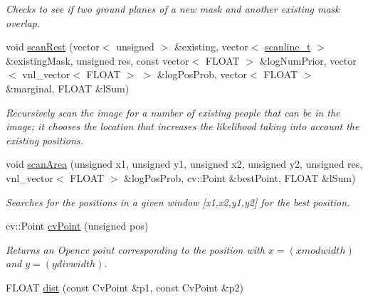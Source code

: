 \begin{DoxyCompactItemize}
\begin{DoxyCompactList}\small\item\em Checks to see if two ground planes of a new mask and another existing mask overlap. \item\end{DoxyCompactList}\item 
\hypertarget{classfindperson_a8611da54df0f3123597e5b09864e52ea}{
void \hyperlink{classfindperson_a8611da54df0f3123597e5b09864e52ea}{scanRest} (vector$<$ unsigned $>$ \&existing, vector$<$ \hyperlink{structscanline__t}{scanline\_\-t} $>$ \&existingMask, unsigned res, const vector$<$ FLOAT $>$ \&logNumPrior, vector$<$ vnl\_\-vector$<$ FLOAT $>$ $>$ \&logPosProb, vector$<$ FLOAT $>$ \&marginal, FLOAT \&lSum)}
\label{classfindperson_a8611da54df0f3123597e5b09864e52ea}

\begin{DoxyCompactList}\small\item\em Recursively scan the image for a number of existing people that can be in the image; it chooses the location that increases the likelihood taking into account the existing positions. \item\end{DoxyCompactList}\item 
\hypertarget{classfindperson_a9692104f77f753a47ee46486f33ca66c}{
void \hyperlink{classfindperson_a9692104f77f753a47ee46486f33ca66c}{scanArea} (unsigned x1, unsigned y1, unsigned x2, unsigned y2, unsigned res, vnl\_\-vector$<$ FLOAT $>$ \&logPosProb, cv::Point \&bestPoint, FLOAT \&lSum)}
\label{classfindperson_a9692104f77f753a47ee46486f33ca66c}

\begin{DoxyCompactList}\small\item\em Searches for the positions in a given window \mbox{[}x1,x2,y1,y2\mbox{]} for the best position. \item\end{DoxyCompactList}\item 
\hypertarget{classfindperson_ac8da170ee071392aeef5385795d4bc3e}{
cv::Point \hyperlink{classfindperson_ac8da170ee071392aeef5385795d4bc3e}{cvPoint} (unsigned pos)}
\label{classfindperson_ac8da170ee071392aeef5385795d4bc3e}

\begin{DoxyCompactList}\small\item\em Returns an Opencv point corresponding to the position with $ x = (x mod width)$ and $ y = (y div width)$. \item\end{DoxyCompactList}\item 
\hypertarget{classfindperson_a400f30b8f239fae9c9b767fb6ecc1d3f}{
FLOAT \hyperlink{classfindperson_a400f30b8f239fae9c9b767fb6ecc1d3f}{dist} (const CvPoint \&p1, const CvPoint \&p2)}
\label{classfindperson_a400f30b8f239fae9c9b767fb6ecc1d3f}


\end{DoxyCompactItemize}
